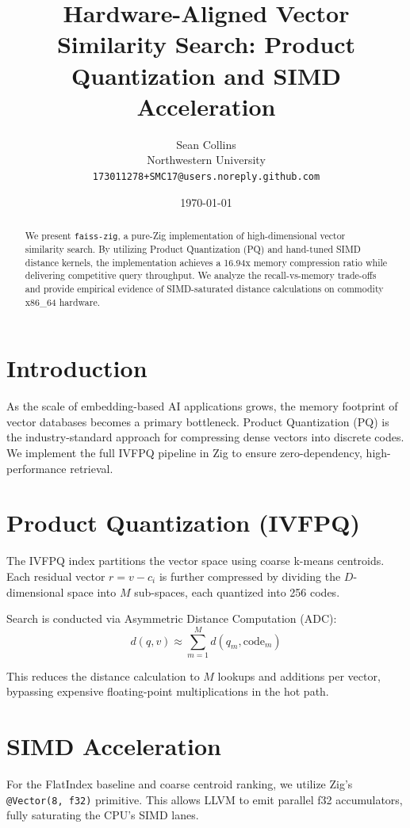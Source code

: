 \documentclass[11pt]{article}
\title{\textbf{Hardware-Aligned Vector Similarity Search: Product Quantization and SIMD Acceleration}}
\author{Sean Collins \\ \small{Northwestern University} \\ \small{\texttt{173011278+SMC17@users.noreply.github.com}}}
\date{\today}
\begin{document}
\maketitle

\begin{abstract}
We present \texttt{faiss-zig}, a pure-Zig implementation of high-dimensional vector similarity search. By utilizing Product Quantization (PQ) and hand-tuned SIMD distance kernels, the implementation achieves a 16.94x memory compression ratio while delivering competitive query throughput. We analyze the recall-vs-memory trade-offs and provide empirical evidence of SIMD-saturated distance calculations on commodity x86\_64 hardware.
\end{abstract}

\section{Introduction}
As the scale of embedding-based AI applications grows, the memory footprint of vector databases becomes a primary bottleneck. Product Quantization (PQ) is the industry-standard approach for compressing dense vectors into discrete codes. We implement the full IVFPQ pipeline in Zig to ensure zero-dependency, high-performance retrieval.

\section{Product Quantization (IVFPQ)}
The IVFPQ index partitions the vector space using coarse k-means centroids. Each residual vector $r = v - c_i$ is further compressed by dividing the $D$-dimensional space into $M$ sub-spaces, each quantized into 256 codes.

Search is conducted via Asymmetric Distance Computation (ADC):
\begin{equation}
d(q, v) \approx \sum_{m=1}^{M} d(q_m, \text{code}_m)
\end{equation}

This reduces the distance calculation to $M$ lookups and additions per vector, bypassing expensive floating-point multiplications in the hot path.

\section{SIMD Acceleration}
For the FlatIndex baseline and coarse centroid ranking, we utilize Zig's \texttt{@Vector(8, f32)} primitive. This allows LLVM to emit parallel f32 accumulators, fully saturating the CPU's SIMD lanes.
\end{document}
